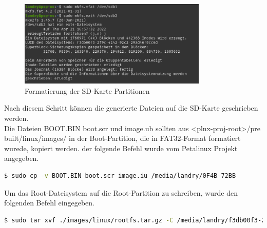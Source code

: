 \begin{figure}[H]
	\begin{center}		\includegraphics[width=0.8\textwidth]{./images/sd-karte_format.jpg}
	\end{center}
	\vspace{-5pt}
	\caption[Formatierung der SD-Karte Partitionen]{Formatierung der SD-Karte Partitionen} %
	\label{fig:sd_karte:formatieerung}
	\vspace{-5pt}
\end{figure}

Nach diesem Schritt können die generierte Dateien auf die SD-Karte geschrieben werden. \\
Die Dateien BOOT.BIN boot.scr und image.ub sollten aus <plnx-proj-root>/pre built/linux/images/ in der Boot-Partition, die in FAT32-Format formatiert wurede, kopiert werden. der folgende Befehl wurde vom Petalinux Projekt angegeben.

\begin{lstlisting}[language=bash]
	$ sudo cp -v BOOT.BIN boot.scr image.iu /media/landry/0F4B-72BB
\end{lstlisting}

Um das Root-Dateisystem auf die Root-Partition zu schreiben, wurde den folgenden Befehl eingegeben.
\begin{lstlisting}[language=bash]
 	$ sudo tar xvf ./images/linux/rootfs.tar.gz -C /media/landry/f3db00f3-279c-4142-92c2-29ad46f0cc6d
\end{lstlisting}

